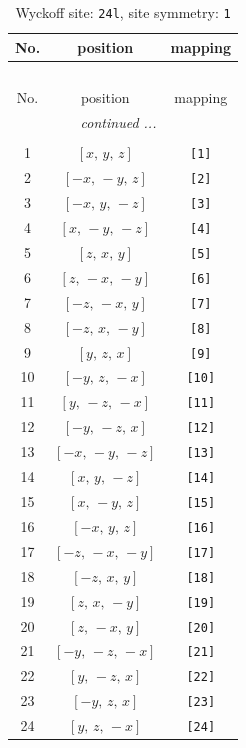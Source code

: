 \documentclass[fleqn,8pt]{jsarticle}
\begin{document}
\begin{longtable}{ccc}
\caption{Wyckoff site: {\tt 24l}, site symmetry: {\tt 1}}
 \\
 \hline \hline
No. & position & mapping \\ \hline \endfirsthead

\multicolumn{2}{l}{\tablename\ \thetable{}} \\
 \hline \hline
No. & position & mapping \\ \hline \endhead

 \hline \hline
\multicolumn{2}{r}{\footnotesize\it continued ...} \\ \endfoot

 \hline \hline
\multicolumn{2}{r}{} \\ \endlastfoot

1 & $\left[ x,\, y,\, z \right]$ & {\tt [1]} \\ \hline
2 & $\left[ - x,\, - y,\, z \right]$ & {\tt [2]} \\ \hline
3 & $\left[ - x,\, y,\, - z \right]$ & {\tt [3]} \\ \hline
4 & $\left[ x,\, - y,\, - z \right]$ & {\tt [4]} \\ \hline
5 & $\left[ z,\, x,\, y \right]$ & {\tt [5]} \\ \hline
6 & $\left[ z,\, - x,\, - y \right]$ & {\tt [6]} \\ \hline
7 & $\left[ - z,\, - x,\, y \right]$ & {\tt [7]} \\ \hline
8 & $\left[ - z,\, x,\, - y \right]$ & {\tt [8]} \\ \hline
9 & $\left[ y,\, z,\, x \right]$ & {\tt [9]} \\ \hline
10 & $\left[ - y,\, z,\, - x \right]$ & {\tt [10]} \\ \hline
11 & $\left[ y,\, - z,\, - x \right]$ & {\tt [11]} \\ \hline
12 & $\left[ - y,\, - z,\, x \right]$ & {\tt [12]} \\ \hline
13 & $\left[ - x,\, - y,\, - z \right]$ & {\tt [13]} \\ \hline
14 & $\left[ x,\, y,\, - z \right]$ & {\tt [14]} \\ \hline
15 & $\left[ x,\, - y,\, z \right]$ & {\tt [15]} \\ \hline
16 & $\left[ - x,\, y,\, z \right]$ & {\tt [16]} \\ \hline
17 & $\left[ - z,\, - x,\, - y \right]$ & {\tt [17]} \\ \hline
18 & $\left[ - z,\, x,\, y \right]$ & {\tt [18]} \\ \hline
19 & $\left[ z,\, x,\, - y \right]$ & {\tt [19]} \\ \hline
20 & $\left[ z,\, - x,\, y \right]$ & {\tt [20]} \\ \hline
21 & $\left[ - y,\, - z,\, - x \right]$ & {\tt [21]} \\ \hline
22 & $\left[ y,\, - z,\, x \right]$ & {\tt [22]} \\ \hline
23 & $\left[ - y,\, z,\, x \right]$ & {\tt [23]} \\ \hline
24 & $\left[ y,\, z,\, - x \right]$ & {\tt [24]} \\
\end{longtable}
\end{document}
